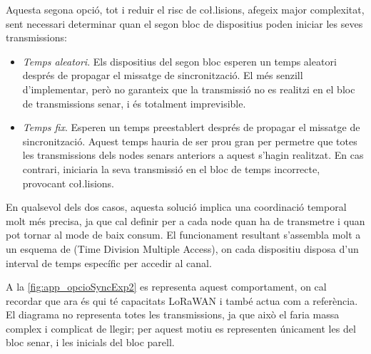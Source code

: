 \documentclass{tfgitic}[2024/07/01]
\begin{document}
{Aquesta segona opció, tot i reduir el risc de co\l.lisions, afegeix major complexitat, sent necessari determinar quan el segon bloc de dispositius poden iniciar les seves transmissions:
\begin{itemize}
    \item \emph{Temps aleatori}. Els dispositius del segon bloc esperen un temps aleatori després de propagar el missatge de sincronització. El més senzill d'implementar, però no garanteix que la transmissió no es realitzi en el bloc de transmissions senar, i és totalment imprevisible.
    \item \emph{Temps fix}. Esperen un temps preestablert després de propagar el missatge de sincronització. Aquest temps hauria de ser prou gran per permetre que totes les transmissions dels nodes senars anteriors a aquest s'hagin realitzat. En cas contrari, iniciaria la seva transmissió en el bloc de temps incorrecte, provocant co\l.lisions.
\end{itemize}


En qualsevol dels dos casos, aquesta solució implica una coordinació temporal molt més precisa, ja que cal definir per a cada node quan ha de transmetre i quan pot tornar al mode de baix consum. El funcionament resultant s'assembla molt a un esquema de  (Time Division Multiple Access), on cada dispositiu disposa d'un interval de temps específic per accedir al canal.

A la \autoref{fig:app_opcioSyncExp2} es representa aquest comportament, on cal recordar que  ara és qui té capacitats LoRaWAN i també actua com a referència. El diagrama no representa totes les transmissions, ja que això el faria massa complex i complicat de llegir; per aquest motiu es representen únicament les del bloc senar, i les inicials del bloc parell.

}
\end{document}
